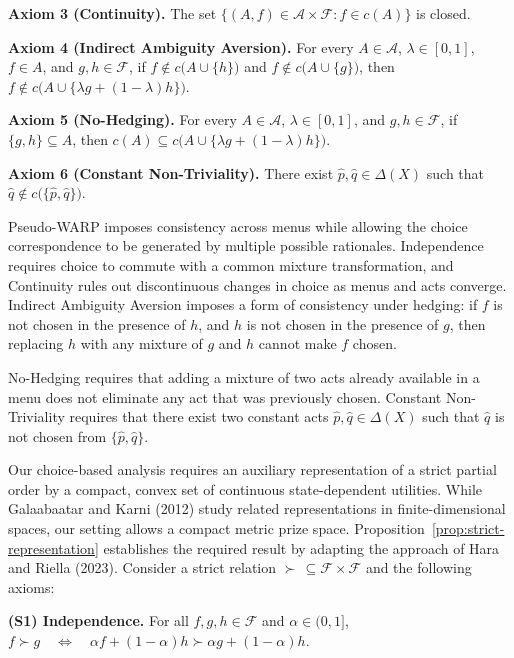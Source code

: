 \documentclass[11pt]{article}
\begin{document}
\medskip
\noindent\textbf{Axiom 3 (Continuity).} The set $\bigl\{(A,f)\in\mathcal{A}\times\mathcal{F}:f\in c(A)\bigr\}$ is closed.

\medskip
\noindent\textbf{Axiom 4 (Indirect Ambiguity Aversion).} For every $A\in\mathcal{A}$, $\lambda\in[0,1]$, $f\in A$, and $g,h\in\mathcal{F}$, if $f\notin c\bigl(A\cup\{h\}\bigr)$ and $f\notin c\bigl(A\cup\{g\}\bigr)$, then $f\notin c\bigl(A\cup\{\lambda g+(1-\lambda)h\}\bigr)$.

\medskip
\noindent\textbf{Axiom 5 (No-Hedging).} For every $A\in\mathcal{A}$, $\lambda\in[0,1]$, and $g,h\in\mathcal{F}$, if $\{g,h\}\subseteq A$, then $c(A)\subseteq c\bigl(A\cup\{\lambda g+(1-\lambda)h\}\bigr)$.

\medskip
\noindent\textbf{Axiom 6 (Constant Non-Triviality).} There exist
$\hat p,\hat q\in\Delta(X)$ such that
$\hat q\notin c\bigl(\{\hat p,\hat q\}\bigr)$.

\medskip
Pseudo-WARP imposes consistency across menus while allowing the choice correspondence to be generated by multiple possible rationales. Independence requires choice to commute with a common mixture transformation, and Continuity rules out discontinuous changes in choice as menus and acts converge. Indirect Ambiguity Aversion imposes a form of consistency under hedging: if $f$ is not chosen in the presence of $h$, and $h$ is not chosen in the presence of $g$, then replacing $h$ with any mixture of $g$ and $h$ cannot make $f$ chosen. 

No-Hedging requires that adding a mixture of two acts already available in a menu does not eliminate any act that was previously chosen. Constant Non-Triviality requires that there exist two constant acts $\hat p,\hat q\in\Delta(X)$ such that $\hat q$ is not chosen from $\{\hat p,\hat q\}$.

Our choice-based analysis requires an auxiliary representation of a strict
partial order by a compact, convex set of continuous state-dependent
utilities. While Galaabaatar and Karni (2012) study related representations in
finite-dimensional spaces, our setting allows a compact metric prize space.
Proposition~\ref{prop:strict-representation} establishes the required result by adapting the approach of
Hara and Riella (2023). Consider a strict relation $\succ\,\subseteq\mathcal{F}\times\mathcal{F}$
and the following axioms:

\medskip
\noindent\textbf{(S1) Independence.} For all $f,g,h\in\mathcal{F}$ and
$\alpha\in(0,1]$, $f\succ g
    \quad\Longleftrightarrow\quad
    \alpha f+(1-\alpha)h\succ\alpha g+(1-\alpha)h$.
\end{document}
